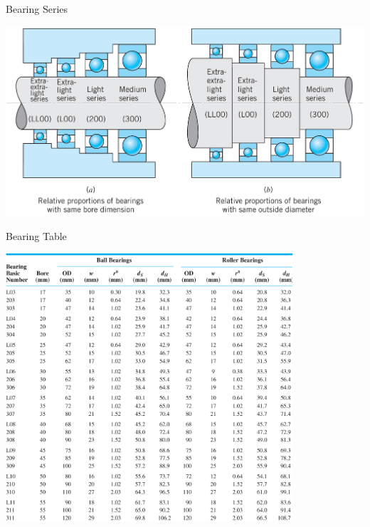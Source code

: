 \documentclass[10pt, svgnames]{beamer}
\begin{document}
\begin{frame}[label={sec:org3bed9f2}]{Bearing Series}
\begin{center}
\includegraphics[width=.9\linewidth]{./pictures/bearing-series.png}
\end{center}
\end{frame}

\begin{frame}[label={sec:orgb85b70b}]{Bearing Table}
\begin{center}
\includegraphics[width=0.8\textwidth]{./pictures/bearing-table.png}
\end{center}
\end{frame}
\end{document}
